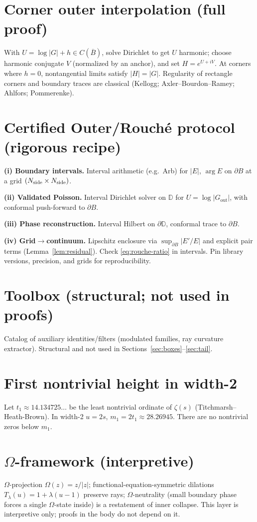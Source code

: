 \documentclass[11pt]{article}
\numberwithin{equation}{section}
\theoremstyle{remark}
\newcommand{\D}{\mathbb{D}}
\newcommand{\Gout}{G_{\mathrm{out}}}
\begin{document}
\section{Corner outer interpolation (full proof)}\label{app:corner}
With $U=\log|G|+h\in C(\overline B)$, solve Dirichlet to get $U$ harmonic; choose harmonic conjugate $V$ (normalized by an anchor), and set $H=e^{U+iV}$. At corners where $h=0$, nontangential limits satisfy $|H|=|G|$. Regularity of rectangle corners and boundary traces are classical (Kellogg; Axler--Bourdon--Ramey; Ahlfors; Pommerenke).

\section{Certified Outer/Rouch\'e protocol (rigorous recipe)}\label{app:cert}
\textbf{(i) Boundary intervals.} Interval arithmetic (e.g.\ Arb) for $|E|$, $\arg E$ on $\partial B$ at a grid $(N_{\rm side}\times N_{\rm side})$.

\noindent\textbf{(ii) Validated Poisson.} Interval Dirichlet solver on $\D$ for $U=\log|\Gout|$, with conformal push-forward to $\partial B$.

\noindent\textbf{(iii) Phase reconstruction.} Interval Hilbert on $\partial\D$, conformal trace to $\partial B$.

\noindent\textbf{(iv) Grid$\to$continuum.} Lipschitz enclosure via $\sup_{\partial B}|E'/E|$ and explicit pair terms (Lemma~\ref{lem:residual}). Check \eqref{eq:rouche-ratio} in intervals. Pin library versions, precision, and grids for reproducibility.

\section{Toolbox (structural; not used in proofs)}\label{app:toolbox}
Catalog of auxiliary identities/filters (modulated families, ray curvature extractor). Structural and not used in Sections~\ref{sec:boxes}--\ref{sec:tail}.

\section{First nontrivial height in width-2}\label{app:firstheight}
Let $t_1\approx 14.134725\ldots$ be the least nontrivial ordinate of $\zeta(s)$ (Titchmarsh--Heath-Brown). In width-2 $u=2s$, $m_1=2t_1\approx 28.26945$. There are no nontrivial zeros below $m_1$.

\section{$\Omega$-framework (interpretive)}\label{app:omega}
$\Omega$-projection $\Omega(z)=z/|z|$; functional-equation-symmetric dilations $T_\lambda(u)=1+\lambda(u-1)$ preserve rays; $\Omega$-neutrality (small boundary phase forces a single $\Omega$-state inside) is a restatement of inner collapse. This layer is interpretive only; proofs in the body do not depend on it.
\end{document}
